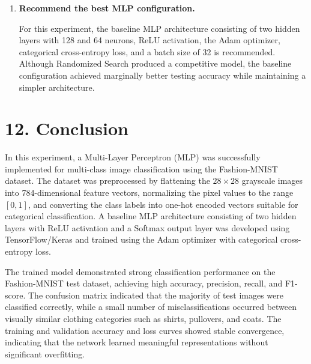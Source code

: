 \documentclass[11pt]{article}
\begin{document}
\begin{enumerate}
Grid Search evaluates every possible combination of hyperparameters, making it computationally expensive for large search spaces. In contrast, Randomized Search evaluates only a randomly selected subset of combinations, significantly reducing computation time while still identifying competitive hyperparameter configurations. Therefore, Randomized Search is more suitable for deep learning models with numerous tunable parameters.

\vspace{3mm}

\item \textbf{Recommend the best MLP configuration.}

For this experiment, the baseline MLP architecture consisting of two hidden layers with 128 and 64 neurons, ReLU activation, the Adam optimizer, categorical cross-entropy loss, and a batch size of 32 is recommended. Although Randomized Search produced a competitive model, the baseline configuration achieved marginally better testing accuracy while maintaining a simpler architecture.

\end{enumerate}

\section*{12. Conclusion}

In this experiment, a Multi-Layer Perceptron (MLP) was successfully implemented for multi-class image classification using the Fashion-MNIST dataset. The dataset was preprocessed by flattening the $28 \times 28$ grayscale images into 784-dimensional feature vectors, normalizing the pixel values to the range $[0,1]$, and converting the class labels into one-hot encoded vectors suitable for categorical classification. A baseline MLP architecture consisting of two hidden layers with ReLU activation and a Softmax output layer was developed using TensorFlow/Keras and trained using the Adam optimizer with categorical cross-entropy loss.

The trained model demonstrated strong classification performance on the Fashion-MNIST test dataset, achieving high accuracy, precision, recall, and F1-score. The confusion matrix indicated that the majority of test images were classified correctly, while a small number of misclassifications occurred between visually similar clothing categories such as shirts, pullovers, and coats. The training and validation accuracy and loss curves showed stable convergence, indicating that the network learned meaningful representations without significant overfitting.
\end{document}
